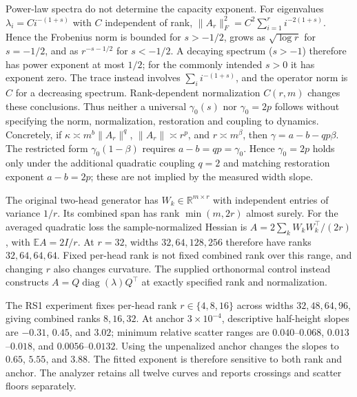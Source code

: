 \documentclass{article}
\begin{document}
Power-law spectra do not determine the capacity exponent. For eigenvalues $\lambda_i=C i^{-(1+s)}$ with $C$ independent of rank,
$\|A_r\|_F^2=C^2\sum_{i=1}^r i^{-2(1+s)}$. Hence the Frobenius norm is bounded for $s>-1/2$, grows as $\sqrt{\log r}$ for $s=-1/2$, and as $r^{-s-1/2}$ for $s<-1/2$. A decaying spectrum ($s>-1$) therefore has power exponent at most $1/2$; for the commonly intended $s>0$ it has exponent zero. The trace instead involves $\sum_i i^{-(1+s)}$, and the operator norm is $C$ for a decreasing spectrum. Rank-dependent normalization $C(r,m)$ changes these conclusions. Thus neither a universal $\gamma_0(s)$ nor $\gamma_0=2p$ follows without specifying the norm, normalization, restoration and coupling to dynamics. Concretely, if $\kappa\asymp m^b\|A_r\|^q$, $\|A_r\|\asymp r^p$, and $r\asymp m^\beta$, then $\gamma=a-b-qp\beta$. The restricted form $\gamma_0(1-\beta)$ requires $a-b=qp=\gamma_0$. Hence $\gamma_0=2p$ holds only under the additional quadratic coupling $q=2$ and matching restoration exponent $a-b=2p$; these are not implied by the measured width slope.

The original two-head generator has $W_k\in\mathbb R^{m\times r}$ with independent entries of variance $1/r$. Its combined span has rank $\min(m,2r)$ almost surely. For the averaged quadratic loss the sample-normalized Hessian is $A=2\sum_k W_kW_k^\top/(2r)$, with $\mathbb E A=2I/r$. At $r=32$, widths $32,64,128,256$ therefore have ranks $32,64,64,64$. Fixed per-head rank is not fixed combined rank over this range, and changing $r$ also changes curvature. The supplied orthonormal control instead constructs $A=Q\operatorname{diag}(\lambda)Q^\top$ at exactly specified rank and normalization.

The RS1 experiment fixes per-head rank $r\in\{4,8,16\}$ across widths $32,48,64,96$, giving combined ranks $8,16,32$. At anchor $3\times10^{-4}$, descriptive half-height slopes are $-0.31$, $0.45$, and $3.02$; minimum relative scatter ranges are $0.040$--$0.068$, $0.013$--$0.018$, and $0.0056$--$0.0132$. Using the unpenalized anchor changes the slopes to $0.65$, $5.55$, and $3.88$. The fitted exponent is therefore sensitive to both rank and anchor. The analyzer retains all twelve curves and reports crossings and scatter floors separately.
\end{document}
